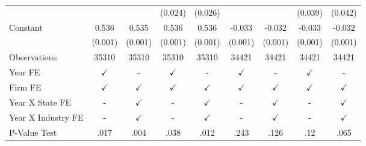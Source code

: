 {\begin{tabular}{l*{8}{c}}
                    &                     &                     &     (0.024)         &     (0.026)         &                     &                     &     (0.039)         &     (0.042)         \\
Constant            &       0.536\sym{***}&       0.535\sym{***}&       0.536\sym{***}&       0.536\sym{***}&      -0.033\sym{***}&      -0.032\sym{***}&      -0.033\sym{***}&      -0.032\sym{***}\\
                    &     (0.001)         &     (0.001)         &     (0.001)         &     (0.001)         &     (0.001)         &     (0.001)         &     (0.001)         &     (0.001)         \\
\midrule
Observations        &       35310         &       35310         &       35310         &       35310         &       34421         &       34421         &       34421         &       34421         \\
Year FE             &$\checkmark$         &           -         &$\checkmark$         &           -         &$\checkmark$         &           -         &$\checkmark$         &           -         \\
Firm FE             &$\checkmark$         &$\checkmark$         &$\checkmark$         &$\checkmark$         &$\checkmark$         &$\checkmark$         &$\checkmark$         &$\checkmark$         \\
Year X State FE     &           -         &$\checkmark$         &           -         &$\checkmark$         &           -         &$\checkmark$         &           -         &$\checkmark$         \\
Year X Industry FE  &           -         &$\checkmark$         &           -         &$\checkmark$         &           -         &$\checkmark$         &           -         &$\checkmark$         \\
P-Value Test        &        .017         &        .004         &        .038         &        .012         &        .243         &        .126         &         .12         &        .065         \\
\bottomrule
\end{tabular}
}
